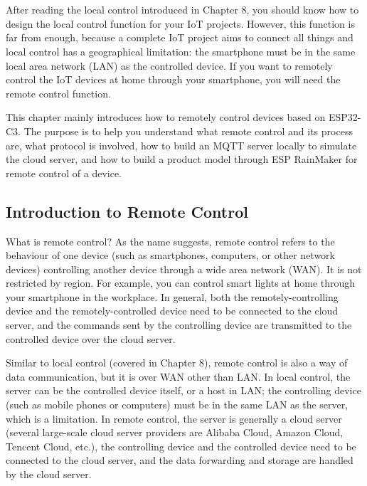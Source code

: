 \documentclass[a4paper,12pt]{book}
\begin{document}

\chapter[Cloud Control]{}

\vspace{36pt}
After reading the local control introduced in Chapter 8, you should know how to design the local control function for your IoT projects. However, this function is far from enough, because a complete IoT project aims to connect all things and local control has a geographical limitation: the smartphone must be in the same local area network (LAN) as the controlled device. If you want to remotely control the IoT devices at home through your smartphone, you will need the remote control function.

This chapter mainly introduces how to remotely control devices based on ESP32-C3. The purpose is to help you understand what remote control and its process are, what protocol is involved, how to build an MQTT server locally to simulate the cloud server, and how to build a product model through ESP RainMaker for remote control of a device.

\section{Introduction to Remote Control}
What is remote control? As the name suggests, remote control refers to the behaviour of one device (such as smartphones, computers, or other network devices) controlling another device through a wide area network (WAN). It is not restricted by region. For example, you can control smart lights at home through your smartphone in the workplace. In general, both the remotely-controlling device and the remotely-controlled device need to be connected to the cloud server, and the commands sent by the controlling device are transmitted to the controlled device over the cloud server.

Similar to local control (covered in Chapter 8), remote control is also a way of data communication, but it is over WAN other than LAN. In local control, the server can be the controlled device itself, or a host in LAN; the controlling device (such as mobile phones or computers) must be in the same LAN as the server, which is a limitation. In remote control, the server is generally a cloud server (several large-scale cloud server providers are Alibaba Cloud, Amazon Cloud, Tencent Cloud, etc.), the controlling device and the controlled device need to be connected to the cloud server, and the data forwarding and storage are handled by the cloud server.
\end{document}
